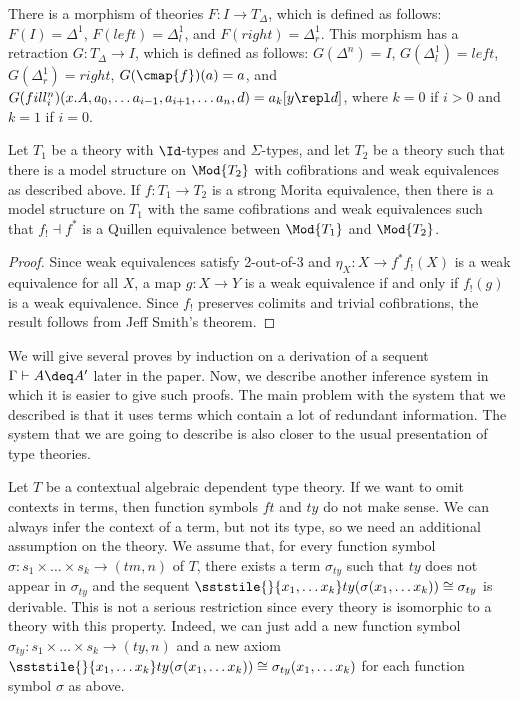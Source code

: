 There is a morphism of theories $F : I \to T_\Delta$, which is defined as follows: $F(I) = \Delta^1$, $F(left) = \Delta^1_l$, and $F(right) = \Delta^1_r$.
This morphism has a retraction $G : T_\Delta \to I$, which is defined as follows: $G(\Delta^n) = I$, $G(\Delta^1_l) = left$, $G(\Delta^1_r) = right$, $G(\cmap{f})(a) = a$,
and $G(fill^n_i)(x.A, a_0, \ldots a_{i-1}, a_{i+1}, \ldots a_n, d) = a_k[y \repl d]$, where $k = 0$ if $i > 0$ and $k = 1$ if $i = 0$.


\begin{lem}
Let $T_1$ be a theory with $\Id$-types and $\Sigma$-types, and let $T_2$ be a theory such that there is a model structure on $\Mod{T_2}$
with cofibrations and weak equivalences as described above.
If $f : T_1 \to T_2$ is a strong Morita equivalence, then there is a model structure on $T_1$ with the same cofibrations and weak equivalences such that
$f_! \dashv f^*$ is a Quillen equivalence between $\Mod{T_1}$ and $\Mod{T_2}$.
\end{lem}
\begin{proof}
Since weak equivalences satisfy 2-out-of-3 and $\eta_X : X \to f^* f_!(X)$ is a weak equivalence for all $X$,
a map $g : X \to Y$ is a weak equivalence if and only if $f_!(g)$ is a weak equivalence.
Since $f_!$ preserves colimits and trivial cofibrations, the result follows from Jeff Smith's theorem.
\end{proof}


We will give several proves by induction on a derivation of a sequent $\Gamma \vdash A \deq A'$ later in the paper.
Now, we describe another inference system in which it is easier to give such proofs.
The main problem with the system that we described is that it uses terms which contain a lot of redundant information.
The system that we are going to describe is also closer to the usual presentation of type theories.

Let $T$ be a contextual algebraic dependent type theory.
If we want to omit contexts in terms, then function symbols $ft$ and $ty$ do not make sense.
We can always infer the context of a term, but not its type, so we need an additional assumption on the theory.
We assume that, for every function symbol $\sigma : s_1 \times \ldots \times s_k \to (tm,n)$ of $T$,
there exists a term $\sigma_{ty}$ such that $ty$ does not appear in $\sigma_{ty}$ and the sequent $\sststile{}{x_1, \ldots x_k} ty(\sigma(x_1, \ldots x_k)) \cong \sigma_{ty}$ is derivable.
This is not a serious restriction since every theory is isomorphic to a theory with this property.
Indeed, we can just add a new function symbol $\sigma_{ty} : s_1 \times \ldots \times s_k \to (ty,n)$
and a new axiom $\sststile{}{x_1, \ldots x_k} ty(\sigma(x_1, \ldots x_k)) \cong \sigma_{ty}(x_1, \ldots x_k)$ for each function symbol $\sigma$ as above.

